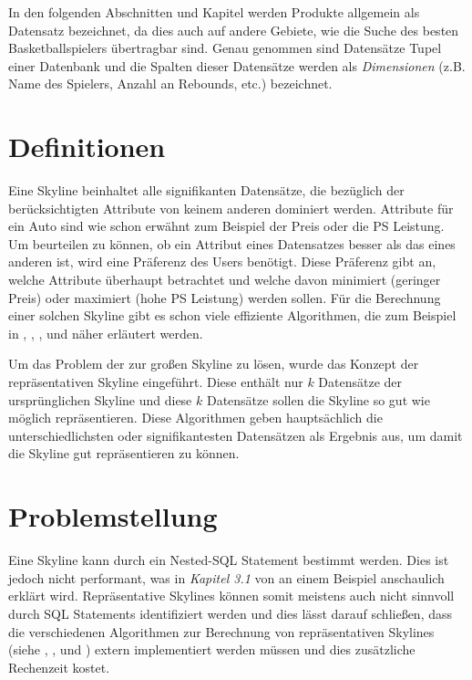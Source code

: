 In den folgenden Abschnitten und Kapitel werden Produkte allgemein als Datensatz bezeichnet, da dies auch auf andere Gebiete, wie die Suche des besten Basketballspielers übertragbar sind.
Genau genommen sind Datensätze Tupel einer Datenbank und die Spalten dieser Datensätze werden als \textit{Dimensionen} (z.B. Name des Spielers, Anzahl an Rebounds, etc.) bezeichnet.
\section{Definitionen}
\label{ch:Einleitung:sec:Definitionen}
Eine Skyline beinhaltet alle signifikanten Datensätze, die bezüglich der berücksichtigten Attribute von keinem anderen dominiert werden. Attribute für ein Auto sind wie schon erwähnt zum Beispiel der Preis oder die PS Leistung. Um beurteilen zu können, ob ein Attribut eines Datensatzes besser als das eines anderen ist, wird eine Präferenz des Users benötigt. Diese Präferenz gibt an, welche Attribute überhaupt betrachtet und welche davon minimiert (geringer Preis) oder maximiert (hohe PS Leistung) werden sollen. Für die Berechnung einer solchen Skyline gibt es schon viele effiziente Algorithmen, die zum Beispiel in \cite{borzsony2001skyline}, \cite{Chan:2006:HDS:2117976.2118017}, \cite{Kossmann:2002:SSS:1287369.1287394}, \cite{Papadias:2003:OPA:872757.872814} und \cite{Tan:2001:EPS:645927.672217} näher erläutert werden.

Um das Problem der zur großen Skyline zu lösen, wurde das Konzept der repräsentativen Skyline eingeführt. Diese enthält nur $k$ Datensätze der ursprünglichen Skyline und diese $k$ Datensätze sollen die Skyline so gut wie möglich repräsentieren. Diese Algorithmen geben hauptsächlich die unterschiedlichsten oder signifikantesten Datensätzen als Ergebnis aus, um damit die Skyline gut repräsentieren zu können. 
\section{Problemstellung}
\label{ch:Einleitung:sec:Problemstellung}
Eine Skyline kann durch ein Nested-SQL Statement bestimmt werden. Dies ist jedoch nicht performant, was in \textit{Kapitel 3.1} von \cite{borzsony2001skyline} an einem Beispiel anschaulich erklärt wird. Repräsentative Skylines können somit meistens auch nicht sinnvoll durch SQL Statements identifiziert werden und dies lässt darauf schließen, dass die verschiedenen Algorithmen zur Berechnung von repräsentativen Skylines (siehe \cite{Tao:2009:DRS:1546683.1547325}, \cite{cai2015efficient}, \cite{magnani2014taking} und \cite{4221657}) extern implementiert werden müssen und dies zusätzliche Rechenzeit kostet.

